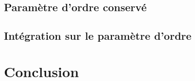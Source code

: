     \subsection{Paramètre d'ordre conservé}
	
    
    \subsection{Intégration sur le paramètre d'ordre}



    \section{Conclusion}
	
	
	
